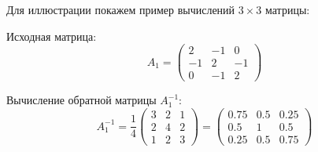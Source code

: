 \documentclass[14pt]{report}
\begin{document}
Для иллюстрации покажем пример вычислений \( 3 \times 3 \) матрицы:

Исходная матрица:
\[
A_{1} = \begin{pmatrix}
2 & -1 & 0 \\
-1 & 2 & -1 \\
0 & -1 & 2
\end{pmatrix}
\]

Вычисление обратной матрицы \( A_{1}^{-1} \):
\[
A_{1}^{-1} = \frac{1}{4} \begin{pmatrix}
3 & 2 & 1 \\
2 & 4 & 2 \\
1 & 2 & 3
\end{pmatrix}
= \begin{pmatrix}
0.75 & 0.5 & 0.25 \\
0.5 & 1 & 0.5 \\
0.25 & 0.5 & 0.75
\end{pmatrix}
\]
\end{document}
